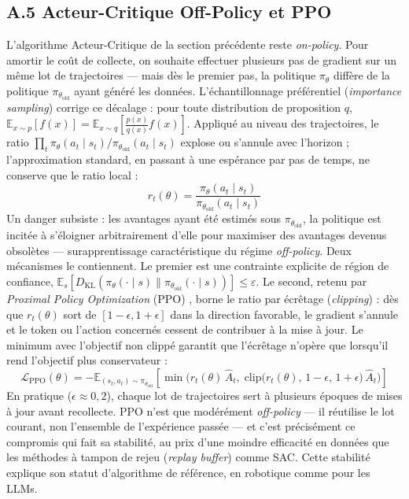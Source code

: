 \documentclass[11pt,a4paper]{article}
\begin{document}
\subsection*{A.5 Acteur-Critique Off-Policy et PPO}
L'algorithme Acteur-Critique de la section précédente reste \emph{on-policy}. Pour amortir le coût de collecte, on souhaite effectuer plusieurs pas de gradient sur un même lot de trajectoires — mais dès le premier pas, la politique $\pi_\theta$ diffère de la politique $\pi_{\theta_{\text{old}}}$ ayant généré les données. L'échantillonnage préférentiel (\emph{importance sampling}) corrige ce décalage : pour toute distribution de proposition $q$, $\mathbb{E}_{x \sim p}[f(x)] = \mathbb{E}_{x \sim q}[\frac{p(x)}{q(x)} f(x)]$. Appliqué au niveau des trajectoires, le ratio $\prod_t \pi_\theta(a_t \mid s_t)/\pi_{\theta_{\text{old}}}(a_t \mid s_t)$ explose ou s'annule avec l'horizon ; l'approximation standard, en passant à une espérance par pas de temps, ne conserve que le ratio local :
\begin{equation}
r_t(\theta) = \frac{\pi_\theta(a_t \mid s_t)}{\pi_{\theta_{\text{old}}}(a_t \mid s_t)}
\end{equation}
Un danger subsiste : les avantages ayant été estimés sous $\pi_{\theta_{\text{old}}}$, la politique est incitée à s'éloigner arbitrairement d'elle pour maximiser des avantages devenus obsolètes — surapprentissage caractéristique du régime \emph{off-policy}. Deux mécanismes le contiennent. Le premier est une contrainte explicite de région de confiance, $\mathbb{E}_s[D_{\text{KL}}(\pi_\theta(\cdot \mid s) \parallel \pi_{\theta_{\text{old}}}(\cdot \mid s))] \leq \varepsilon$. Le second, retenu par \emph{Proximal Policy Optimization} (PPO) \cite{schulman2017proximal}, borne le ratio par écrêtage (\emph{clipping}) : dès que $r_t(\theta)$ sort de $[1-\epsilon, 1+\epsilon]$ dans la direction favorable, le gradient s'annule et le token ou l'action concernés cessent de contribuer à la mise à jour. Le minimum avec l'objectif non clippé garantit que l'écrêtage n'opère que lorsqu'il rend l'objectif plus conservateur :
\begin{equation}
\mathcal{L}_{\text{PPO}}(\theta) = -\mathbb{E}_{(s_t, a_t) \sim \pi_{\theta_{\text{old}}}} \left[ \min\Big( r_t(\theta)\, \hat{A}_t, \; \text{clip}\big(r_t(\theta),\, 1-\epsilon,\, 1+\epsilon\big)\, \hat{A}_t \Big) \right]
\label{eq:ppo}
\end{equation}
En pratique ($\epsilon \approx 0{,}2$), chaque lot de trajectoires sert à plusieurs époques de mises à jour avant recollecte. PPO n'est que modérément \emph{off-policy} — il réutilise le lot courant, non l'ensemble de l'expérience passée — et c'est précisément ce compromis qui fait sa stabilité, au prix d'une moindre efficacité en données que les méthodes à tampon de rejeu (\emph{replay buffer}) comme SAC. Cette stabilité explique son statut d'algorithme de référence, en robotique comme pour les LLMs.
\end{document}
